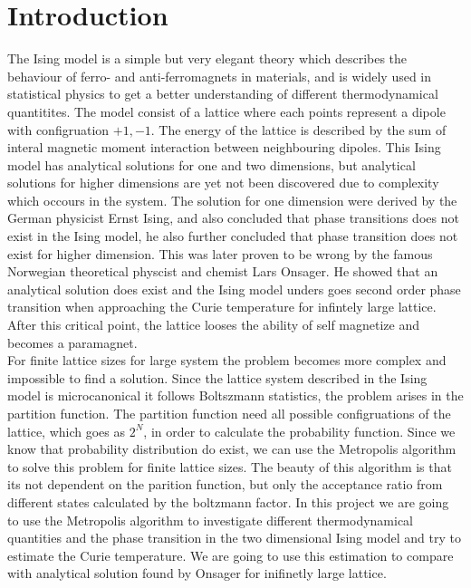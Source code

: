 \documentclass[a4paper, 10pt]{article}
\begin{document}
\section{Introduction} The Ising model is a simple but very elegant theory which describes the
behaviour of ferro- and anti-ferromagnets in materials, and is widely used in statistical physics to get a better understanding of different thermodynamical quantitites.
The model consist of a lattice where each points represent
a dipole with configruation $+1,-1$. The energy of the lattice is described by
the sum of interal magnetic moment interaction between neighbouring dipoles.  This Ising model has analytical solutions
for one and two dimensions, but analytical solutions for higher dimensions are yet not been discovered due to complexity
which occours in the system. The solution for one dimension were derived by the German physicist Ernst Ising, and also concluded
that phase transitions does not exist in the Ising model, he also further concluded that phase transition does not exist for
higher dimension. This was later proven to be wrong by the famous Norwegian theoretical physcist and chemist Lars Onsager.
He showed that an analytical solution does exist and the Ising model unders goes second order phase transition when
approaching the Curie temperature \cite{noe} for infintely large lattice. After this critical point, the lattice looses the ability of self magnetize and becomes
a paramagnet.
\vspace{3mm}
\\
For finite lattice sizes for large system the problem becomes more complex and impossible to find a solution.
Since the lattice system described in the Ising model is microcanonical it follows Boltszmann statistics,
the problem arises in the partition function. The partition function need all possible configruations of the lattice, which goes as $2^{N}$,
in order to calculate the probability function. Since we know that probability distribution do exist, we can use
the Metropolis algorithm to solve this problem for finite lattice sizes.  The beauty of this algorithm is that its not
dependent on the parition function, but only the acceptance ratio from different states calculated by the boltzmann factor.
In this project we are going to use the Metropolis algorithm to investigate different thermodynamical quantities and the phase transition
in the two dimensional Ising model and try to estimate the Curie temperature. We are going to use this estimation to compare with analytical
solution found by Onsager \cite{morten} for inifinetly large lattice.
\end{document}
